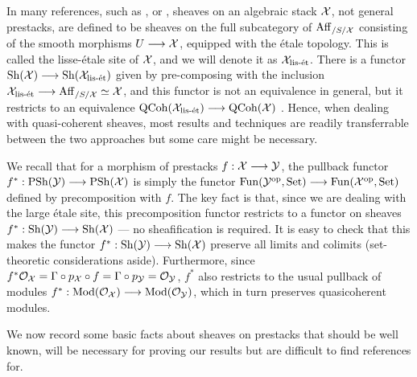 \documentclass[11pt]{amsart}
\begin{document}
\begin{warn}
In many references, such as \cite{Champs-Alg}, \cite{AlperModuli} or
\cite{AG-Olsson}, sheaves on an algebraic stack $\mathcal{X}$, not general prestacks,
are defined to be sheaves on the full subcategory of $\mathrm{Aff}_{/S/\mathcal{X}}$ consisting
of the smooth morphisms $U \to \mcX$, equipped with the \'etale topology.
This is called the lisse-\'etale site of $\mathcal{X}$, and we will denote it as
$\mathcal{X}_{\text{lis-\'et}}$.
There is a functor $\Sh(\mcX) \to \Sh(\mcX_{\text{lis-\'et}})$ given by
pre-composing with the inclusion
$\mcX_{\text{lis-\'et}} \to \Aff_{/S/\mcX} \simeq \mcX$, and this
functor is not an equivalence in general, but it restricts to an equivalence
$\QCoh(\mcX_{\text{lis-\'et}}) \to \QCoh(\mcX)$
\cite[\href{https://stacks.math.columbia.edu/tag/07B1}{Lemma 07B1}]
{stacks-project}. Hence, when dealing with quasi-coherent
sheaves, most results and techniques are readily transferrable between the two
approaches but some care might be necessary.
\end{warn}

\begin{rmk}
We recall that for a morphism of prestacks $f : \mcX \to \mcY$, the pullback
functor $f^* : \PSh(\mcY) \to \PSh(\mcX)$ is simply the functor
$\Fun(\mcY^\op, \Set) \to \Fun(\mcX^\op, \Set)$ defined by precomposition with
$f$. The key fact is that, since we are dealing with the large \'etale site,
this precomposition functor restricts to a functor on sheaves
$f^* : \Sh(\mcY) \to \Sh(\mcX)$
\cite[\href{https://stacks.math.columbia.edu/tag/06TS}{Lemma 06TS}]
{stacks-project} --- no sheafification is required.
It is easy to check that this makes
the functor $f^* : \Sh(\mcY) \to \Sh(\mcX)$ preserve all limits and
colimits (set-theoretic considerations aside).
Furthermore, since $f^*\mathcal{O}_{\mathcal{X}} = \Gamma \circ p_\mathcal{X} \circ f
= \Gamma \circ p_\mathcal{Y} = \mathcal{O}_{\mathcal{Y}}$, $f^*$ also restricts to the usual pullback
of modules $f^* : \Mod(\mcO_\mcX) \to \Mod(\mcO_\mcY)$, which in turn preserves
quasicoherent modules.
\end{rmk}

We now record some basic facts about sheaves on prestacks that should be well
known, will be necessary for proving our results but are difficult to find
references for.
\end{document}
